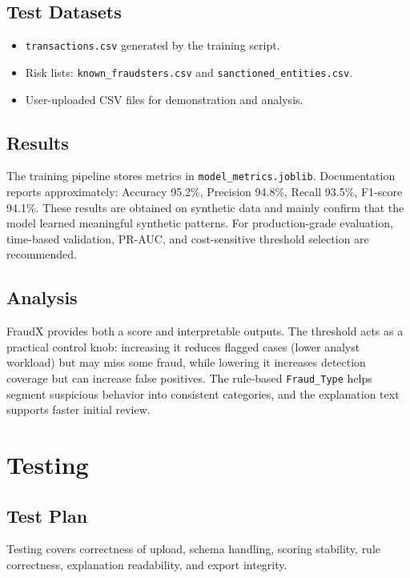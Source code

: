 \documentclass[12pt,a4paper]{report}
\begin{document}
\section{Test Datasets}
\begin{itemize}
  \item \texttt{transactions.csv} generated by the training script.
  \item Risk lists: \texttt{known\_fraudsters.csv} and \texttt{sanctioned\_entities.csv}.
  \item User-uploaded CSV files for demonstration and analysis.
\end{itemize}

\section{Results}
The training pipeline stores metrics in \texttt{model\_metrics.joblib}. Documentation reports approximately: Accuracy 95.2\%, Precision 94.8\%, Recall 93.5\%, F1-score 94.1\%. These results are obtained on synthetic data and mainly confirm that the model learned meaningful synthetic patterns. For production-grade evaluation, time-based validation, PR-AUC, and cost-sensitive threshold selection are recommended.

\section{Analysis}
FraudX provides both a score and interpretable outputs. The threshold acts as a practical control knob: increasing it reduces flagged cases (lower analyst workload) but may miss some fraud, while lowering it increases detection coverage but can increase false positives. The rule-based \texttt{Fraud\_Type} helps segment suspicious behavior into consistent categories, and the explanation text supports faster initial review.

\chapter{Testing}
\section{Test Plan}
Testing covers correctness of upload, schema handling, scoring stability, rule correctness, explanation readability, and export integrity.
\end{document}
